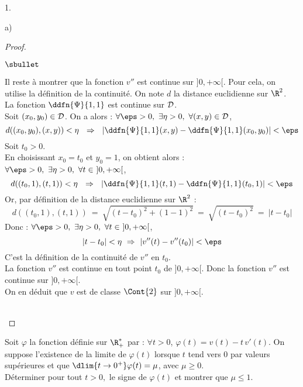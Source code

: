 \documentclass[11pt]{article}%
\begin{document}
\begin{noliste}{1.}
\begin{noliste}{a)}
\begin{proof}
\begin{remark}
\begin{noliste}{$\sbullet$}
      \item Il reste à montrer que la fonction $v''$ est 
      continue sur $]0,+\infty[$. Pour cela, on utilise la 
      définition de la continuité.
      On note $d$ la distance euclidienne sur $\R^2$.\\
      La fonction $\ddfn{\Psi}{1,1}$ est continue sur ${\cal D}$.\\
      Soit $(x_0,y_0)\in {\cal D}$. On a alors :
      $\forall \eps >0, \ \exists \eta >0, \ \forall (x,y) \in 
       {\cal D}$,
      \[
        d((x_0,y_0),(x,y)) < \eta \ \ \Rightarrow \ \
       \vert \ddfn{\Psi}{1,1}(x,y) - \ddfn{\Psi}{1,1}(x_0,y_0) \vert
       < \eps
      \]
      Soit $t_0>0$.\\
      En choisissant $x_0=t_0$ et $y_0=1$, on obtient alors :
      $\forall \eps >0, \ \exists \eta >0, \ \forall t \in 
       \ ]0,+\infty[$,
      \[
        d((t_0,1),(t,1)) < \eta \ \ \Rightarrow \ \
       \vert \ddfn{\Psi}{1,1}(t,1) - \ddfn{\Psi}{1,1}(t_0,1) \vert
       < \eps
      \]
      Or, par définition de la distance euclidienne sur $\R^2$ :
      \[
       d((t_0,1),(t,1)) \ = \ \sqrt{(t-t_0)^2 + (1-1)^2}
       \ = \ \sqrt{(t-t_0)^2} \ = \ \vert t-t_0 \vert
      \]
      Donc :
      $\forall \eps >0, \ \exists \eta >0, \ \forall t \in 
       \ ]0,+\infty[$,
      \[
        \vert t - t_0 \vert < \eta \ \Rightarrow \
       \vert v''(t) - v''(t_0) \vert
       < \eps
      \]
      C'est la définition de la continuité de $v''$ en $t_0$.\\
      La fonction $v''$ est continue en tout point $t_0$ de 
      $]0,+\infty[$. Donc la fonction $v''$ est continue 
      sur $]0,+\infty[$.\\
      On en déduit que $v$ est de classe $\Cont{2}$ sur 
      $]0,+\infty[$.
    \end{noliste}
   \end{remark}~\\[-1.4cm]
  \end{proof}

  
  
  
  \newpage
  
  
  
  
  \item Soit $\varphi$ la fonction définie sur $\R_+^*$ par : $\forall 
  t >0$, $\varphi(t)=v(t)-t \, v'(t)$. On suppose l'existence de la 
  limite de $\varphi(t)$ lorsque $t$ tend vers 0 par valeurs supérieures
  et que $\dlim{t \to 0^+} \varphi(t)=\mu$, avec $\mu \geq 0$.\\
  Déterminer pour tout $t>0,$ le signe de $\varphi(t)$ et montrer que 
  $\mu \leq 1$.
  

\end{noliste}
\end{noliste}
\end{document}
